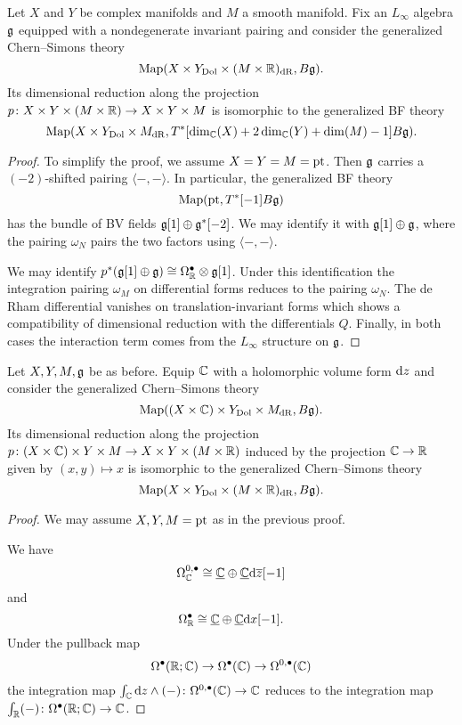 \documentclass[10pt, oneside]{article}
\begin{document}
\begin{prop} \label{CS_diml_red_prop}
Let $X$ and $Y$ be complex manifolds and $M$ a smooth manifold. Fix an $L_\infty$ algebra $\mathfrak g$ equipped with a nondegenerate invariant pairing and consider the generalized Chern--Simons theory
\[\operatorname{Map}(X\times Y_{\mathrm{Dol}}\times (M\times \mathbb R)_{\mathrm{dR}}, B\mathfrak g).\]
Its dimensional reduction along the projection $p\colon X\times Y\times (M\times \mathbb R)\rightarrow X\times Y\times M$ is isomorphic to the generalized BF theory
\[\operatorname{Map}(X\times Y_{\mathrm{Dol}}\times M_{\mathrm{dR}}, T^*[\dim_\mathbb C(X) + 2\dim_\mathbb C(Y) + \dim(M) - 1] B\mathfrak g).\]
\end{prop}

\begin{proof}
To simplify the proof, we assume $X=Y=M=\operatorname{pt}$. Then $\mathfrak g$ carries a $(-2)$-shifted pairing $\langle-,-\rangle$. In particular, the generalized BF theory
\[\operatorname{Map}(\operatorname{pt}, T^*[-1] B \mathfrak g)\]
has the bundle of BV fields $\mathfrak g[1] \oplus \mathfrak g^*[-2]$. We may identify it with $\mathfrak g[1]\oplus \mathfrak g$, where the pairing $\omega_N$ pairs the two factors using $\langle-,-\rangle$.

We may identify $p^*(\mathfrak g[1]\oplus \mathfrak g)\cong \Omega^\bullet_{\mathbb R}\otimes \mathfrak g[1]$. Under this identification the integration pairing $\omega_M$ on differential forms reduces to the pairing $\omega_N$. The de Rham differential vanishes on translation-invariant forms which shows a compatibility of dimensional reduction with the differentials $Q$. Finally, in both cases the interaction term comes from the $L_\infty$ structure on $\mathfrak g$.
\end{proof}

\begin{prop}
Let $X,Y,M,\mathfrak g$ be as before. Equip $\mathbb C$ with a holomorphic volume form ${\rm d} z$ and consider the generalized Chern--Simons theory
\[\operatorname{Map}((X\times \mathbb C)\times Y_{\mathrm{Dol}}\times M_{\mathrm{dR}}, B\mathfrak g).\]
Its dimensional reduction along the projection $p\colon (X\times \mathbb C)\times Y\times M\rightarrow X\times Y\times (M\times \mathbb R)$ induced by the projection $\mathbb C\rightarrow \mathbb R$ given by $(x, y)\mapsto x$ is isomorphic to the generalized Chern--Simons theory
\[\operatorname{Map}(X\times Y_{\mathrm{Dol}}\times (M\times \mathbb R)_{\mathrm{dR}}, B\mathfrak g).\]
\end{prop}
\begin{proof}
We may assume $X,Y,M=\operatorname{pt}$ as in the previous proof.

We have
\[\Omega^{0, \bullet}_{\mathbb C}\cong \underline{\mathbb C}\oplus \underline{\mathbb C}{\rm d} \overline{z}[-1]\]
and
\[\Omega^\bullet_{\mathbb R}\cong \underline{\mathbb C}\oplus \underline{\mathbb C} {\rm d} x[-1].\]
Under the pullback map
\[\Omega^\bullet(\mathbb R; \mathbb C)\rightarrow \Omega^\bullet(\mathbb C)\rightarrow \Omega^{0, \bullet}(\mathbb C)\]
the integration map $\int_\mathbb C {\rm d} z\wedge (-)\colon \Omega^{0, \bullet}(\mathbb C)\rightarrow \mathbb C$ reduces to the integration map $\int_\mathbb R (-)\colon \Omega^{\bullet}(\mathbb R;\mathbb C)\rightarrow \mathbb C$.
\end{proof}
\end{document}
